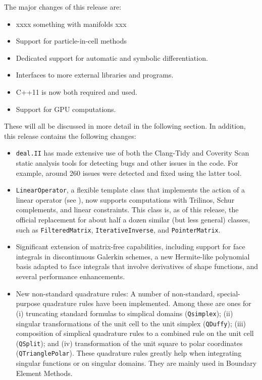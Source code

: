 \documentclass{ansarticle-preprint}
\newcommand{\specialword}[1]{\texttt{#1}}
\newcommand{\dealii}{{\specialword{deal.II}}}
\begin{document}
The major changes of this release are:
\begin{itemize}
\item xxxx something with manifolds xxx
\item Support for particle-in-cell methods
\item Dedicated support for automatic and symbolic differentiation.
\item Interfaces to more external libraries and programs.
\item C++11 is now both required and used.
\item Support for GPU computations.
\end{itemize}
These will all be discussed in more detail in the
following section. In addition, this release contains the following changes:
\begin{itemize}
\item \dealii{} has made extensive use of both the Clang-Tidy \cite{clang-tidy}
  and Coverity Scan \cite{coverity} static analysis tools for detecting bugs
  and other issues in the code. For example, around 260 issues were detected and
  fixed using the latter tool.

\item
  \texttt{LinearOperator}, a flexible template class that implements the action of a
  linear operator (see \cite{MaierBardelloniHeltai-2016-b}), now supports
  computations with Trilinos, Schur complements, and linear constraints. This
  class is, as of this release, the official replacement for about half a dozen
  similar (but less general) classes, such as \texttt{FilteredMatrix},
  \texttt{IterativeInverse}, and \texttt{PointerMatrix}.

\item
  Significant extension of matrix-free capabilities, including support for face
  integrals in discontinuous Galerkin schemes, a new Hermite-like polynomial
  basis adapted to face integrals that involve derivatives of shape functions,
  and several performance enhancements.

\item New non-standard quadrature rules:
A number of non-standard, special-purpose quadrature rules have been
implemented. Among these are ones for
(i) truncating standard formulas to simplical domains (\texttt{Qsimplex});
(ii) singular transformations of the unit cell to the unit simplex
    (\texttt{QDuffy});
(iii) composition of simplical quadrature rules to a combined rule on the
    unit cell (\texttt{QSplit});
and (iv) transformation of the unit square to polar coordinates
    (\texttt{QTrianglePolar}).
These quadrature rules greatly help when integrating singular
functions or on singular domains. They
are mainly used in Boundary Element Methods.
  


\end{itemize}
\end{document}
